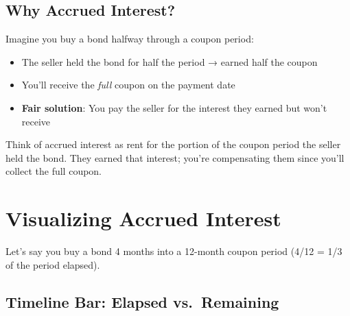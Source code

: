 \documentclass[
  letterpaper,
]{scrbook}
\providecommand{\tightlist}{%
  \setlength{\itemsep}{0pt}\setlength{\parskip}{0pt}}
\begin{document}
\subsection{Why Accrued Interest?}\label{why-accrued-interest}

Imagine you buy a bond halfway through a coupon period:

\begin{itemize}
\tightlist
\item
  The seller held the bond for half the period → earned half the coupon
\item
  You'll receive the \emph{full} coupon on the payment date
\item
  \textbf{Fair solution}: You pay the seller for the interest they
  earned but won't receive
\end{itemize}

\begin{tcolorbox}[enhanced jigsaw, toptitle=1mm, colbacktitle=quarto-callout-tip-color!10!white, opacityback=0, leftrule=.75mm, breakable, colframe=quarto-callout-tip-color-frame, toprule=.15mm, opacitybacktitle=0.6, coltitle=black, bottomrule=.15mm, colback=white, arc=.35mm, titlerule=0mm, rightrule=.15mm, left=2mm, title=\textcolor{quarto-callout-tip-color}{\faLightbulb}\hspace{0.5em}{Intuition: ``Rent'' for the Time Period}, bottomtitle=1mm]

Think of accrued interest as rent for the portion of the coupon period
the seller held the bond. They earned that interest; you're compensating
them since you'll collect the full coupon.

\end{tcolorbox}

\section{Visualizing Accrued
Interest}\label{visualizing-accrued-interest}

Let's say you buy a bond 4 months into a 12-month coupon period (4/12 =
1/3 of the period elapsed).

\subsection{Timeline Bar: Elapsed
vs.~Remaining}\label{timeline-bar-elapsed-vs.-remaining}
\end{document}
